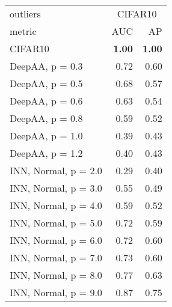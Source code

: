 \begin{tabular}{lrr}
\toprule
{outliers} & \multicolumn{2}{c}{CIFAR10} \\
{metric} & {AUC} & {AP} \\
\midrule
CIFAR10 & \bfseries 1.00 & \bfseries 1.00 \\
DeepAA, p = 0.3 & 0.72 & 0.60 \\
DeepAA, p = 0.5 & 0.68 & 0.57 \\
DeepAA, p = 0.6 & 0.63 & 0.54 \\
DeepAA, p = 0.8 & 0.59 & 0.52 \\
DeepAA, p = 1.0 & 0.39 & 0.43 \\
DeepAA, p = 1.2 & 0.40 & 0.43 \\
INN, Normal, p = 2.0 & 0.29 & 0.40 \\
INN, Normal, p = 3.0 & 0.55 & 0.49 \\
INN, Normal, p = 4.0 & 0.59 & 0.52 \\
INN, Normal, p = 5.0 & 0.72 & 0.59 \\
INN, Normal, p = 6.0 & 0.72 & 0.60 \\
INN, Normal, p = 7.0 & 0.73 & 0.60 \\
INN, Normal, p = 8.0 & 0.77 & 0.63 \\
INN, Normal, p = 9.0 & 0.87 & 0.75 \\
\bottomrule
\end{tabular}
